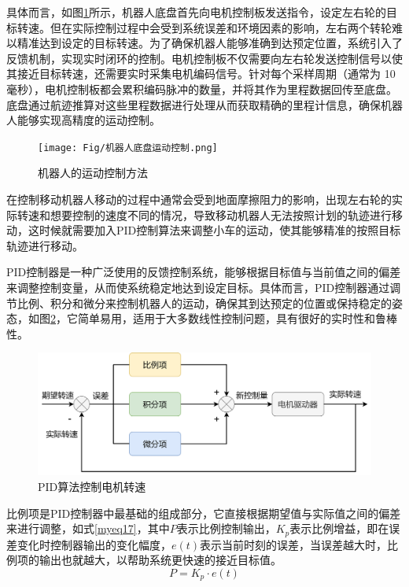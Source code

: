 具体而言，如图\ref{motion_control}所示，机器人底盘首先向电机控制板发送指令，设定左右轮的目标转速。但在实际控制过程中会受到系统误差和环境因素的影响，左右两个转轮难以精准达到设定的目标转速。为了确保机器人能够准确到达预定位置，系统引入了反馈机制，实现实时闭环的控制。电机控制板不仅需要向左右轮发送控制信号以使其接近目标转速，还需要实时采集电机编码信号。针对每个采样周期（通常为 10 毫秒），电机控制板都会累积编码脉冲的数量，并将其作为里程数据回传至底盘。底盘通过航迹推算对这些里程数据进行处理从而获取精确的里程计信息，确保机器人能够实现高精度的运动控制。
\begin{figure}[htbp]
    \centering
    \texttt{[image: Fig/机器人底盘运动控制.png]}
    \caption{\label{motion_control}机器人的运动控制方法}
\end{figure}

在控制移动机器人移动的过程中通常会受到地面摩擦阻力的影响，出现左右轮的实际转速和想要控制的速度不同的情况，导致移动机器人无法按照计划的轨迹进行移动，这时候就需要加入PID控制算法来调整小车的运动，使其能够精准的按照目标轨迹进行移动。

PID控制器是一种广泛使用的反馈控制系统，能够根据目标值与当前值之间的偏差来调整控制变量，从而使系统稳定地达到设定目标。具体而言，PID控制器通过调节比例、积分和微分来控制机器人的运动，确保其到达预定的位置或保持稳定的姿态，如图\ref{pid}，它简单易用，适用于大多数线性控制问题，具有很好的实时性和鲁棒性。
\begin{figure}[htbp]
    \centering
    \includegraphics[scale=0.10]{Fig/pid.png}
    \caption{\label{pid}PID算法控制电机转速}
\end{figure}

比例项是PID控制器中最基础的组成部分，它直接根据期望值与实际值之间的偏差来进行调整，如式\ref{myeq17}，其中$P$表示比例控制输出，${K_p}$表示比例增益，即在误差变化时控制器输出的变化幅度，$e\left( t \right)$表示当前时刻的误差，当误差越大时，比例项的输出也就越大，以帮助系统更快速的接近目标值。
\begin{equation}
    P = {K_p} \cdot e\left( t \right)
    \label{myeq17}
\end{equation}

